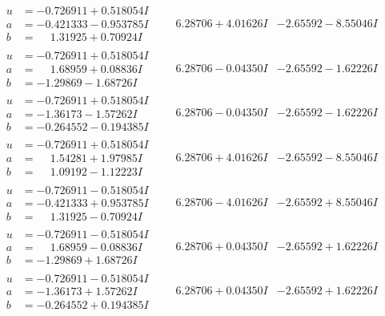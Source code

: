 \documentclass[1p]{elsarticle_modified}
\theoremstyle{definition}
\begin{document}
$$\begin{array}{c|c|c}
\begin{aligned}
u &= -0.726911 + 0.518054 I \\
a &= -0.421333 - 0.953785 I \\
b &= \phantom{-}1.31925 + 0.70924 I\end{aligned}
 & \phantom{-}6.28706 + 4.01626 I & -2.65592 - 8.55046 I \\ \hline\begin{aligned}
u &= -0.726911 + 0.518054 I \\
a &= \phantom{-}1.68959 + 0.08836 I \\
b &= -1.29869 - 1.68726 I\end{aligned}
 & \phantom{-}6.28706 - 0.04350 I & -2.65592 - 1.62226 I \\ \hline\begin{aligned}
u &= -0.726911 + 0.518054 I \\
a &= -1.36173 - 1.57262 I \\
b &= -0.264552 - 0.194385 I\end{aligned}
 & \phantom{-}6.28706 - 0.04350 I & -2.65592 - 1.62226 I \\ \hline\begin{aligned}
u &= -0.726911 + 0.518054 I \\
a &= \phantom{-}1.54281 + 1.97985 I \\
b &= \phantom{-}1.09192 - 1.12223 I\end{aligned}
 & \phantom{-}6.28706 + 4.01626 I & -2.65592 - 8.55046 I \\ \hline\begin{aligned}
u &= -0.726911 - 0.518054 I \\
a &= -0.421333 + 0.953785 I \\
b &= \phantom{-}1.31925 - 0.70924 I\end{aligned}
 & \phantom{-}6.28706 - 4.01626 I & -2.65592 + 8.55046 I \\ \hline\begin{aligned}
u &= -0.726911 - 0.518054 I \\
a &= \phantom{-}1.68959 - 0.08836 I \\
b &= -1.29869 + 1.68726 I\end{aligned}
 & \phantom{-}6.28706 + 0.04350 I & -2.65592 + 1.62226 I \\ \hline\begin{aligned}
u &= -0.726911 - 0.518054 I \\
a &= -1.36173 + 1.57262 I \\
b &= -0.264552 + 0.194385 I\end{aligned}
 & \phantom{-}6.28706 + 0.04350 I & -2.65592 + 1.62226 I \\ \hline\begin{aligned}

\end{aligned}
\end{array}$$
\end{document}
